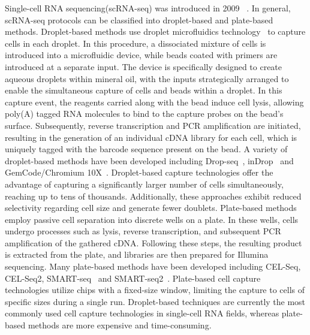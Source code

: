 Single-cell RNA sequencing(scRNA-seq) was introduced in 2009 ~\citep{tang2009mrna}. In general, scRNA-seq protocols can be classified into droplet-based and plate-based methods. Droplet-based methods use droplet microfluidics technology~\citep{dropletcompare2019, droplet2019practice} to capture cells in each droplet. In this procedure, a dissociated mixture of cells is introduced into a microfluidic device, while beads coated with primers are introduced at a separate input. The device is specifically designed to create aqueous droplets within mineral oil, with the inputs strategically arranged to enable the simultaneous capture of cells and beads within a droplet. In this capture event, the reagents carried along with the bead induce cell lysis, allowing poly(A) tagged RNA molecules to bind to the capture probes on the bead's surface. Subsequently, reverse transcription and PCR amplification are initiated, resulting in the generation of an individual cDNA library for each cell, which is uniquely tagged with the barcode sequence present on the bead. A variety of droplet-based methods have been developed including Drop-seq~\citep{dropseq2015}, inDrop~\citep{indrop2015} and GemCode/Chromium 10X~\citep{zheng2017massively}. Droplet-based capture technologies offer the advantage of capturing a significantly larger number of cells simultaneously, reaching up to tens of thousands. Additionally, these approaches exhibit reduced selectivity regarding cell size and generate fewer doublets. Plate-based methods employ passive cell separation into discrete wells on a plate. In these wells, cells undergo processes such as lysis, reverse transcription, and subsequent PCR amplification of the gathered cDNA. Following these steps, the resulting product is extracted from the plate, and libraries are then prepared for Illumina sequencing. Many plate-based methods have been developed including CEL-Seq\citep{hashimshony2012celseq}, CEL-Seq2\citep{hashimshony2016celseq2}, SMART-seq~\citep{goetz2012smartseq} and SMART-seq2~\citep{Picelli2014smartseq}. Plate-based cell capture technologies utilize chips with a fixed-size window, limiting the capture to cells of specific sizes during a single run. Droplet-based techniques are currently the most commonly used cell capture technologies in single-cell RNA fields, whereas plate-based methods are more expensive and time-consuming.

